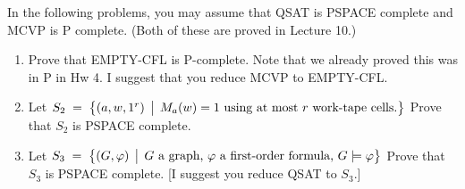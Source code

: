 \documentclass[12pt]{article}
\begin{document}
\thispagestyle{empty}
\noindent{}
\addtocounter{section}{8}

In the following problems, you may assume that QSAT is PSPACE complete and MCVP is P complete. (Both
of these are proved in Lecture 10.)

\begin{enumerate}
\item Prove that EMPTY-CFL is P-complete.  Note that we already
proved this was in P in Hw 4.  I suggest that you reduce MCVP to
EMPTY-CFL.  

\item Let $S_2  \; =\; \bigl\{ (a,w,1^r) \,\bigm|\, M_a(w) =1 \mbox{ using at most $r$ work-tape cells.} \bigr\}$
Prove that $S_2$ is PSPACE complete.

\item  Let $S_3 \; =\; \bigl\{ (G,\varphi) \,\bigm|\, \mbox{$G$ a graph, $\varphi$ a first-order formula, $G\models
    \varphi$} \bigr\}$   Prove that $S_3$ is PSPACE complete.  [I suggest you reduce QSAT to $S_3$.]


\end{enumerate}
\end{document}
